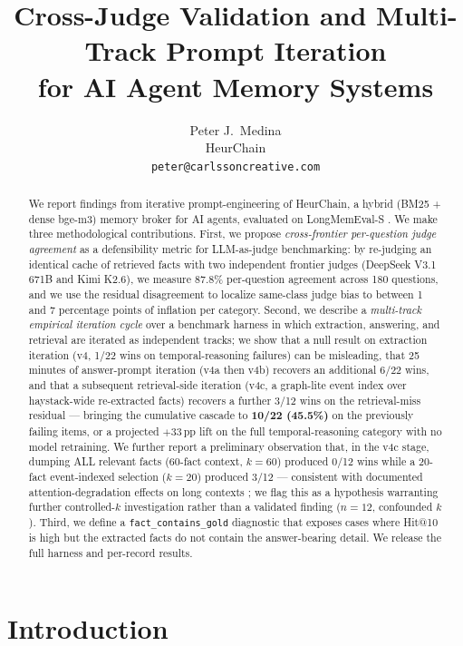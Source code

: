\documentclass{article}
\title{Cross-Judge Validation and Multi-Track Prompt Iteration\\for AI Agent Memory Systems}
\author{%
  Peter J.\ Medina\\
  HeurChain\\
  \texttt{peter@carlssoncreative.com}\\
}
\begin{document}
\maketitle

\begin{abstract}
We report findings from iterative prompt-engineering of HeurChain, a hybrid (BM25 + dense bge-m3) memory broker for AI agents, evaluated on LongMemEval-S \citep{longmemeval_2025}. We make three methodological contributions. First, we propose \emph{cross-frontier per-question judge agreement} as a defensibility metric for LLM-as-judge benchmarking: by re-judging an identical cache of retrieved facts with two independent frontier judges (DeepSeek V3.1 671B and Kimi K2.6), we measure 87.8\% per-question agreement across 180 questions, and we use the residual disagreement to localize same-class judge bias to between 1 and 7 percentage points of inflation per category. Second, we describe a \emph{multi-track empirical iteration cycle} over a benchmark harness in which extraction, answering, and retrieval are iterated as independent tracks; we show that a null result on extraction iteration (v4, 1/22 wins on temporal-reasoning failures) can be misleading, that 25 minutes of answer-prompt iteration (v4a then v4b) recovers an additional 6/22 wins, and that a subsequent retrieval-side iteration (v4c, a graph-lite event index over haystack-wide re-extracted facts) recovers a further 3/12 wins on the retrieval-miss residual --- bringing the cumulative cascade to \textbf{10/22 (45.5\%)} on the previously failing items, or a projected $+33$\,pp lift on the full temporal-reasoning category with no model retraining. We further report a preliminary observation that, in the v4c stage, dumping ALL relevant facts (60-fact context, $k=60$) produced 0/12 wins while a 20-fact event-indexed selection ($k=20$) produced 3/12 --- consistent with documented attention-degradation effects on long contexts \citep{liu2024lost}; we flag this as a hypothesis warranting further controlled-$k$ investigation rather than a validated finding ($n=12$, confounded $k$). Third, we define a \texttt{fact\_contains\_gold} diagnostic that exposes cases where Hit@10 is high but the extracted facts do not contain the answer-bearing detail. We release the full harness and per-record results.
\end{abstract}

\section{Introduction}
\label{sec:intro}
\end{document}
